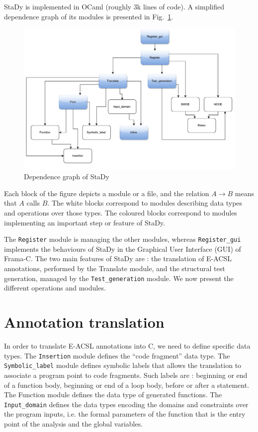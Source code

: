 \documentclass[web]{frama-c-book}
\begin{document}
StaDy is implemented in OCaml (roughly 3k lines of code). A simplified dependence graph of its modules is presented in Fig.~\ref{fig:stady-deps}.

\begin{figure}\centering
  \includegraphics[scale=.5]{stady_architecture.pdf}
  \caption{Dependence graph of StaDy\label{fig:stady-deps}}
\end{figure}

Each block of the figure depicts a module or a file, and the relation $A \rightarrow B$ means that $A$ calls $B$. The white blocks correspond to modules describing data types and operations over those types. The coloured blocks correspond to modules implementing an important step or feature of StaDy.

The \lstinline[language=OCaml]'Register' module is managing the other modules, whereas \lstinline[language=OCaml]'Register_gui' implements the behaviours of StaDy in the Graphical User Interface (GUI) of Frama-C. The two main features of StaDy are : the translation of E-ACSL annotations, performed by the Translate module, and the structural test generation, managed by the \lstinline[language=OCaml]'Test_generation' module. We now present the different operations and modules.

\section{Annotation translation}

In order to translate E-ACSL annotations into C, we need to define specific data types. The \lstinline[language=OCaml]'Insertion' module defines the ``code fragment'' data type. The \lstinline[language=OCaml]'Symbolic_label' module defines symbolic labels that allows the translation to associate a program point to code fragments. Such labels are : beginning or end of a function body, beginning or end of a loop body, before or after a statement. The Function module defines the data type of generated functions. The \lstinline[language=OCaml]'Input_domain' defines the data types encoding the domains and constraints over the program inputs, i.e. the formal parameters of the function that is the entry point of the analysis and the global variables.
\end{document}
